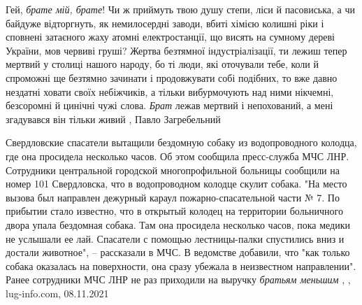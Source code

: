 Гей, \emph{брате мій, брате}! Чи ж приймуть твою душу степи, ліси й пасовиська, а чи
байдуже відторгнуть, як немилосердні заводи, вбиті хімією колишні ріки і
сповнені затаєного жаху атомні електростанції, що висять на сумному дереві
України, мов червиві груші? Жертва безтямної індустріалізації, ти лежиш тепер
мертвий у столиці нашого народу, бо ті люди, які оточували тебе, коли й
спроможні ще безтямно зачинати і продовжувати собі подібних, то вже давно
нездатні ховати своїх небіжчиків, а тільки вибурмочують над ними нікчемні,
безсоромні й цинічні чужі слова.  \emph{Брат} лежав мертвий і непохований, а мені
згадувався він тільки живий
, Павло Загребельний 

Свердловские спасатели вытащили бездомную собаку из водопроводного колодца, где
она просидела несколько часов. Об этом сообщила пресс-служба МЧС ЛНР.
Сотрудники центральной городской многопрофильной больницы сообщили на номер 101
Свердловска, что в водопроводном колодце скулит собака.  "На место вызова был
направлен дежурный караул пожарно-спасательной части № 7.  По прибытии стало
известно, что в открытый колодец на территории больничного двора упала
бездомная собака. Там она просидела несколько часов, пока медики не услышали ее
лай. Спасатели с помощью лестницы-палки спустились вниз и достали животное", –
рассказали в МЧС.  В ведомстве добавили, что "как только собака оказалась на
поверхности, она сразу убежала в неизвестном направлении".  Ранее сотрудники
МЧС ЛНР не раз приходили на выручку \emph{братьям меньшим}
, 
, lug-info.com, 08.11.2021
